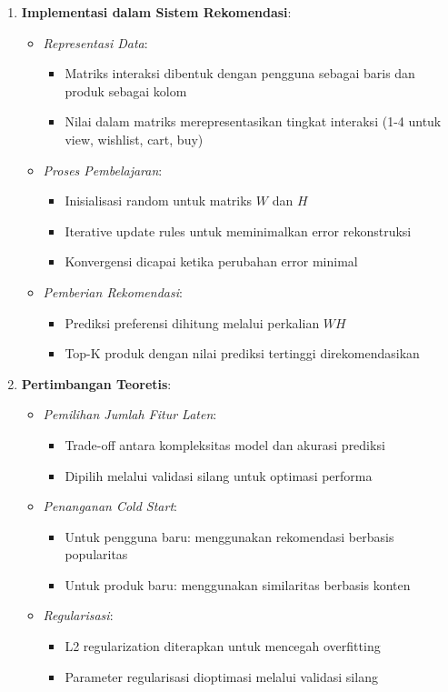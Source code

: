 \documentclass[journal,article,submit,pdftex,moreauthors]{Definitions/mdpi}
\begin{document}
\begin{enumerate}
    \item \textbf{Implementasi dalam Sistem Rekomendasi}:
    \begin{itemize}
        \item \textit{Representasi Data}:
        \begin{itemize}
            \item Matriks interaksi dibentuk dengan pengguna sebagai baris dan produk sebagai kolom
            \item Nilai dalam matriks merepresentasikan tingkat interaksi (1-4 untuk view, wishlist, cart, buy)
        \end{itemize}
        \item \textit{Proses Pembelajaran}:
        \begin{itemize}
            \item Inisialisasi random untuk matriks \(W\) dan \(H\)
            \item Iterative update rules untuk meminimalkan error rekonstruksi
            \item Konvergensi dicapai ketika perubahan error minimal
        \end{itemize}
        \item \textit{Pemberian Rekomendasi}:
        \begin{itemize}
            \item Prediksi preferensi dihitung melalui perkalian \(WH\)
            \item Top-K produk dengan nilai prediksi tertinggi direkomendasikan
        \end{itemize}
    \end{itemize}

    \item \textbf{Pertimbangan Teoretis}:
    \begin{itemize}
        \item \textit{Pemilihan Jumlah Fitur Laten}: 
        \begin{itemize}
            \item Trade-off antara kompleksitas model dan akurasi prediksi
            \item Dipilih melalui validasi silang untuk optimasi performa
        \end{itemize}
        \item \textit{Penanganan Cold Start}:
        \begin{itemize}
            \item Untuk pengguna baru: menggunakan rekomendasi berbasis popularitas
            \item Untuk produk baru: menggunakan similaritas berbasis konten
        \end{itemize}
        \item \textit{Regularisasi}:
        \begin{itemize}
            \item L2 regularization diterapkan untuk mencegah overfitting
            \item Parameter regularisasi dioptimasi melalui validasi silang
        \end{itemize}
    \end{itemize}
\end{enumerate}
\end{document}
